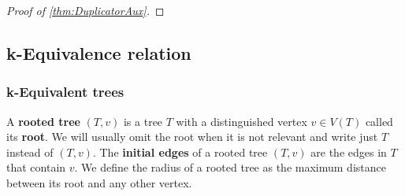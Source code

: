 \documentclass[12pt,notitlepage,a4paper]{article}
\theoremstyle{definition}
\begin{document}
\begin{proof}[Proof of \cref{thm:DuplicatorAux}]
%		
%	
\end{proof}



\subsection{k-Equivalence relation}


\subsubsection{k-Equivalent trees} \label{sect:equivtrees}


A \textbf{rooted tree} $(T,v)$ is a tree $T$ with a 
distinguished vertex $v\in V(T)$ called its \textbf{root}.
We will usually omit the root when it is not relevant and 
write just $T$ instead of $(T,v)$. The
\textbf{initial edges} of a rooted tree $(T,v)$ are 
the edges in $T$ that contain $v$. 
We define the radius of a rooted tree
as the maximum distance between its root
and any other vertex. 
\par
\end{document}
